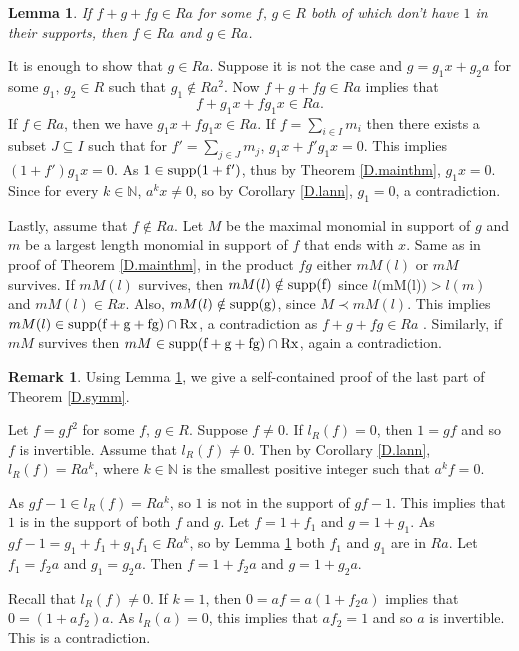 \documentclass[12pt]{article}
\makeatletter
\theoremstyle{plain}
\newtheorem{lemma}[thm]{Lemma}
\theoremstyle{definition}
\newtheorem*{remark}{Remark}
\renewenvironment{proof}[1][\proofname]{%
	\par\pushQED{\qed}%
	\normalfont %
	\topsep6\p@\@plus6\p@\relax
	\trivlist
	\item[\hskip\labelsep\bfseries #1\@addpunct{.}]%
}{%
	\popQED\endtrivlist\@endpefalse
}
\renewcommand{\proofname}{Proof}
\makeatother
\begin{document}
	\begin{lemma}\label{D.aa}
		If $f + g + fg \in Ra$ for some $f,\,g \in R$ both of which don't have $1$ in their supports, then $f \in Ra$ and $g \in Ra$.
	\end{lemma}
	\begin{proof}
		It is enough to show that $g \in Ra$. Suppose it is not the case and $g = g_1x + g_2a$ for some $g_1,\, g_2 \in R$ such that $g_1 \notin Ra^2$. Now $f + g + fg \in Ra$ implies that $$f + g_1x + fg_1x \in Ra.$$ If $f \in Ra$, then we have $g_1x + fg_1x \in Ra$. If $f=\sum_{i \in I} m_i$ then there exists a subset $J \subseteq I$ such that for $f'= \sum_{j \in J}m_j$, $g_1x + f'g_1x=0$. This implies $(1+f')g_1x=0$. As $1 \in \rm{supp}(1+f')$, thus by Theorem \ref{D.mainthm}, $g_1x=0$. Since for every $k \in \mathbb{N}$, $a^kx \neq 0$, so by Corollary \ref{D.lann}, $g_1 = 0$, a contradiction. 
		
		Lastly, assume that $  f\notin Ra$. Let $M$ be the maximal monomial in support of $g$ and $m$ be a largest length monomial in support of $f$ that ends with $x$. Same as in proof of Theorem \ref{D.mainthm}, in the product $fg$ either $mM(l)$ or $mM$ survives. If $mM(l)$ survives, then $mM(l) \notin \rm{supp}(f)$ since $l($mM(l)$)>l(m)$ and $mM(l) \in Rx$. Also, $mM(l) \notin \rm{supp}(g)$, since $ M \prec mM(l)$. This implies $mM(l) \in \rm{supp}(f+g+fg) \cap Rx$, a contradiction as $f + g + fg \in Ra$ . Similarly, if $mM$ survives then $mM \in \rm{supp}(f+g+fg) \cap Rx$, again a contradiction.
	\end{proof}
	\begin{remark}
		Using Lemma \ref{D.aa}, we give a self-contained proof of the last part of Theorem \ref{D.symm}.
	\end{remark}
	
	Let $f = gf^2$ for some $f,\,g\in R$. Suppose $f \neq 0$. If $l_R(f) = 0$, then $1=gf$ and so $f$ is invertible. Assume that $l_R(f) \neq 0$. Then by Corollary \ref{D.lann}, $l_R(f) = Ra^k$, where $k \in \mathbb{N}$ is the smallest positive integer such that $a^kf = 0$. 
	
	As $gf - 1 \in  l_R(f) = Ra^k$, so $1$ is not in the support of $gf-1$. This implies that $1$ is in the support of both $f$ and $g$. Let $f = 1+ f_1$ and $g = 1 + g_1$. As $gf-1 = g_1  + f_1 + g_1f_1 \in Ra^k$, so by Lemma \ref{D.aa} both $f_1$ and $g_1$ are in $Ra$. Let $f_1 = f_2a$ and $g_1 = g_2a$. Then $f = 1+ f_2a$ and $g = 1+g_2a$. 
	
	Recall that $l_R(f) \neq 0$. If $k = 1$, then $0 = af = a(1 + f_2a)$ implies that $0 = (1+af_2)a$. As $l_R(a) = 0$, this implies that $af_2 = 1$ and so $a$ is invertible. This is a contradiction. 
	
\end{document}
